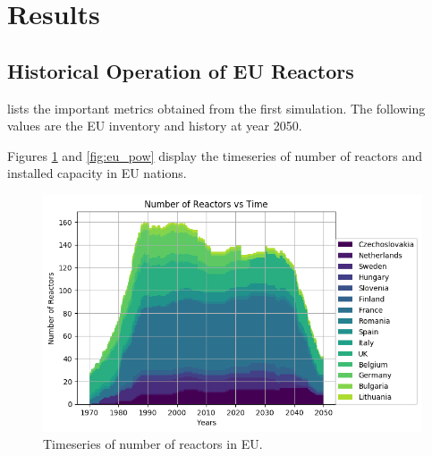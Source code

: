 \section{Results}

\subsection{Historical Operation of \gls{EU} Reactors}


\begin{table}[h]
	\centering
		\caption{Simulation Results for Historical Nuclear Operation of \gls{EU} Nations}
		\label{tab:sim_result}
		\end {table}
		
		 lists the important metrics
		obtained from the first simulation. The following
		values are the \gls{EU} inventory and history at year 2050.
		
		Figures \ref{fig:eu_num} and \ref{fig:eu_pow} display the
		timeseries of number of reactors and installed capacity in \gls{EU} nations.
		
		
		\begin{figure}[htbp!]
			\begin{center}
				\includegraphics[width=\columnwidth]{./images/eu_future/number_plot.png}
			\end{center}
			\caption{Timeseries of number of reactors in \gls{EU}.}
			\label{fig:eu_num}
		\end{figure}
		
